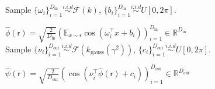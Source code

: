\documentclass[25pt, a0paper, portrait, margin=0mm, innermargin=10mm,
     blockverticalspace=7mm, colspace=8mm, subcolspace=8mm]{tikzposter} %
\begin{document}
\begin{columns}
{\begin{spacing}{1.3}
\begin{algorithmic}[1]
\STATE Sample  $\{ \omega_i \}_{i=1}^{D_\mathrm{in}} \overset{i.i.d}{\sim} \mathscr{F}(k)$,
\hspace{2cm}
$\{b_i\}_{i=1}^{D_\mathrm{in}} \overset{i.i.d}{\sim} U[0, 2\pi] $.



\STATE $\hat{\phi}(\mathsf{r}) = \sqrt{\frac{2}{D_\mathrm{in}}} \left(
\mathbb{E}_{x \sim \mathsf{r}} 
\cos(\omega_{i}^{\top}x+b_{i} ) \right)_{i=1}^{D_\mathrm{in}} \in \mathbb{R}^{D_\mathrm{in}}$ \\
%
%
\STATE Sample $\{ \nu_i \}_{i=1}^{D_\mathrm{out}} \overset{i.i.d}{\sim}
\mathscr{F}({k}_{\text{gauss}}(\gamma^{2}))$, \hspace{2cm}
$\{c_i\}_{i=1}^{D_\mathrm{out}} \overset{i.i.d}{\sim} U[0, 2\pi] $.


\STATE $\hat{\psi}(\mathsf{r}) = \sqrt{\frac{2}{D_\mathrm{out}}} \left(  
\cos(\nu_{i}^{\top} \hat{\phi}(\mathsf{r}) + c_{i} ) \right)_{i=1}^{D_\mathrm{out}} \in 
\mathbb{R}^{D_\mathrm{out}}$
\end{algorithmic}
\end{spacing}

}
\end{columns}
\end{document}
